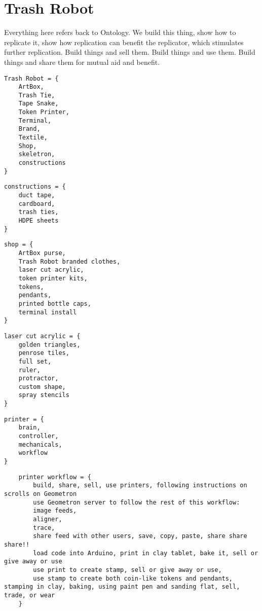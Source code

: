 \section{Trash Robot}

Everything here refers back to Ontology.  We build this thing, show how to replicate it, show how replication can benefit the replicator, which stimulates further replication.  Build things and sell them. Build things and use them. Build things and share them for mutual aid and benefit. 

\begin{verbatim}
Trash Robot = {
    ArtBox,
    Trash Tie,
    Tape Snake,
    Token Printer,
    Terminal,
    Brand,
    Textile,
    Shop,
    skeletron,
    constructions
}
\end{verbatim}
    
\begin{verbatim}
constructions = {
    duct tape, 
    cardboard, 
    trash ties, 
    HDPE sheets
}
\end{verbatim}
\begin{verbatim}
shop = {
    ArtBox purse, 
    Trash Robot branded clothes, 
    laser cut acrylic, 
    token printer kits,
    tokens,
    pendants,
    printed bottle caps,
    terminal install
}
\end{verbatim}

\begin{verbatim}
laser cut acrylic = {
    golden triangles, 
    penrose tiles, 
    full set, 
    ruler,
    protractor,
    custom shape,
    spray stencils
}
\end{verbatim}

\begin{verbatim}
printer = {
    brain,
    controller,
    mechanicals,
    workflow
}
\end{verbatim}

\begin{verbatim}
    printer workflow = {
        build, share, sell, use printers, following instructions on scrolls on Geometron
        use Geometron server to follow the rest of this workflow: 
        image feeds,
        aligner,
        trace,
        share feed with other users, save, copy, paste, share share share!!
        load code into Arduino, print in clay tablet, bake it, sell or give away or use
        use print to create stamp, sell or give away or use,
        use stamp to create both coin-like tokens and pendants, stamping in clay, baking, using paint pen and sanding flat, sell, trade, or wear
    }
\end{verbatim}
    